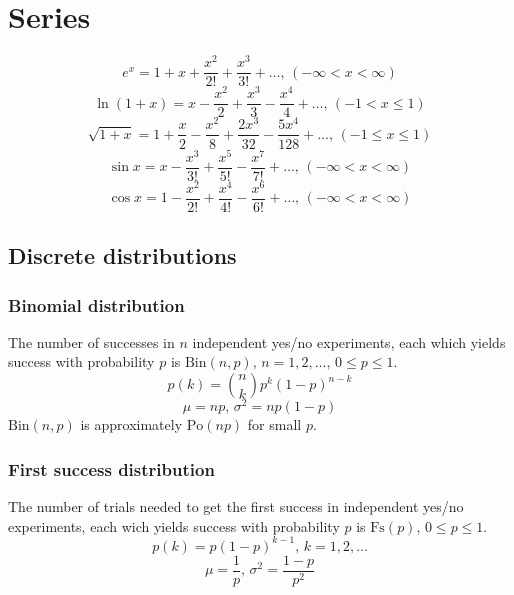\section{Series}
$$e^x = 1+x+\frac{x^2}{2!}+\frac{x^3}{3!}+\dots,\,(-\infty<x<\infty)$$
$$\ln(1+x) = x-\frac{x^2}{2}+\frac{x^3}{3}-\frac{x^4}{4}+\dots,\,(-1<x\leq1)$$
$$\sqrt{1+x} = 1+\frac{x}{2}-\frac{x^2}{8}+\frac{2x^3}{32}-\frac{5x^4}{128}+\dots,\,(-1\leq x\leq1)$$
$$\sin x = x-\frac{x^3}{3!}+\frac{x^5}{5!}-\frac{x^7}{7!}+\dots,\,(-\infty<x<\infty)$$
$$\cos x = 1-\frac{x^2}{2!}+\frac{x^4}{4!}-\frac{x^6}{6!}+\dots,\,(-\infty<x<\infty)$$



\subsection{Discrete distributions}

\subsubsection{Binomial distribution}
The number of successes in $n$ independent yes/no experiments, each which yields success with probability $p$ is $\textrm{Bin}(n,p),\,n=1,2,\dots,\, 0\leq p\leq1$.
\[p(k)=\binom{n}{k}p^k(1-p)^{n-k}\]
\[\mu = np,\,\sigma^2=np(1-p)\]
$\textrm{Bin}(n,p)$ is approximately $\textrm{Po}(np)$ for small $p$.

\subsubsection{First success distribution}
The number of trials needed to get the first success in independent yes/no experiments, each wich yields success with probability $p$ is $\textrm{Fs}(p),\,0\leq p\leq1$.
\[p(k)=p(1-p)^{k-1},\,k=1,2,\dots\]
\[\mu = \frac1p,\,\sigma^2=\frac{1-p}{p^2}\]

